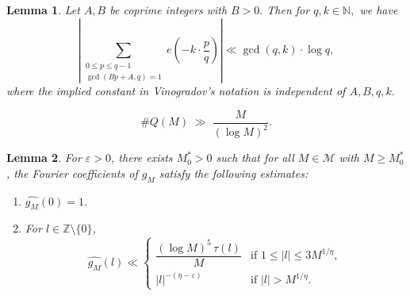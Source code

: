 \documentclass[10pt,a4paper]{amsart}
\newtheorem{lem}{Lemma}
\begin{document}
\begin{lem}\label{grs}
Let $A, B$ be coprime integers with $B>0.$ Then for $q,k\in\mathbb{N},$ we have
\[\left|\sum_{\substack{0\le p\le q-1 \\ \gcd(Bp+A,q)=1}}e(-k\cdot \frac{p}{q})\right|\ll \gcd(q,k)\cdot \log q,\]
where the implied constant in Vinogradov’s notation is independent of $A,B,q,k.$
\end{lem}

\begin{equation}\label{Q(M)}
\# Q(M) \;\gg\; \frac{M}{(\log M)^{2}}.
\end{equation}

\begin{lem}\label{gM_Fourier}
For $\varepsilon>0$, there exists $M_0^{\ast}>0$ such that for all $M\in\mathcal{M}$ with $M\ge M_0^{\ast}$, the Fourier coefficients of $g_M$ satisfy the following estimates:
\begin{enumerate}
\item[(1)] $\widehat{g_M}(0)=1$.
\item[(2)] For $l\in \mathbb{Z}\setminus \{0\}$,
\[
 \widehat{g_M}(l)  \ll
\begin{cases}
\dfrac{(\log M)^{5}\,\tau(l)}{M} & \text{if } 1\le |l|\le 3 M^{1/\eta}, \\[10pt]
|l|^{-(\eta-\varepsilon)} & \text{if } |l| > M^{1/\eta}.
\end{cases}
\]

\end{enumerate}
\end{lem}
\end{document}
